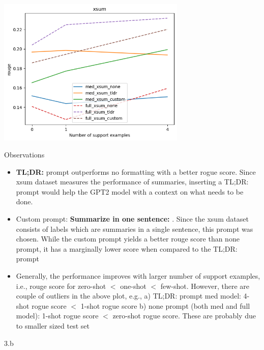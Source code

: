 \begin{answer}
    \includegraphics[width=9cm]{figures/icl_xsum_plot.png}

    Observations
    \begin{itemize}
        \item \textbf{TL;DR: } prompt outperforms no formatting with a better rogue score. Since xsum dataset measures the performance of summaries, inserting a TL;DR: prompt would help the GPT2 model with a context on what needs to be done.
        \item Custom prompt: \textbf{Summarize in one sentence: }. Since the xsum dataset consists of labels which are summaries in a single sentence, this prompt was chosen. While the custom prompt yields a better rouge score than none prompt, it has a marginally lower score when compared to the TL;DR: prompt
        \item Generally, the performance improves with larger number of support examples, i.e., rouge score for zero-shot $<$ one-shot $<$ few-shot. However, there are couple of outliers in the above plot, e.g., a) TL;DR: prompt med model: 4-shot rogue score $<$ 1-shot rogue score b) none prompt (both med and full model): 1-shot rogue score $<$ zero-shot rogue score. These are probably due to smaller sized test set 
    \end{itemize}
    
\end{answer}

\clearpage

\LARGE
3.b
\normalsize

